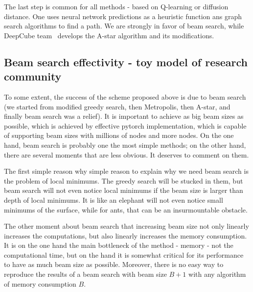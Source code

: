 \documentclass[atmp]{ipart_v1}
\numberwithin{equation}{section}
\theoremstyle{plain}%
\begin{document}
The last step is common for all methods - based on Q-learning or diffusion distance. One uses neural network predictions as a heuristic function ans graph search algorithms to find a path. We are strongly in favor of beam search, while DeepCube team~\cite{mcaleer2019solving, agostinelli2019solving, khandelwal2024towards,agostinelli2024q} develops the A-star algorithm and its modifications.

\subsection{Beam search effectivity - toy model of research community }

To some extent, the success of the scheme proposed above is due to beam search (we started from modified greedy search, then Metropolis, then A-star, and finally beam search was a relief). It is important to achieve as big beam sizes as possible, which is achieved by effective pytorch implementation, which  is capable of supporting beam sizes with millions of nodes and more nodes. On the one hand, beam search is probably one the most simple methods; on the other hand, there are several moments that are less obvious. It deserves to comment on them. 

The first simple reason why simple reason to explain why we need beam search is the problem of local minimums. The greedy search will be stucked in them, but beam search will not even notice local minimums if the beam size is larger than depth of local minimums. 
It is like an elephant will not even notice small minimums of the surface, while for ants, that can be an insurmountable obstacle. 

The other moment about beam search that increasing beam size not only linearly increases the computations, but also linearly increases the memory consumption. It is on the one hand the main bottleneck of the method - memory - not the computational time, but on the hand it is somewhat critical for its performance to have as much beam size as possible. Moreover, there is no easy way to reproduce the results of a beam search with beam size $B+1$ with any algorithm of memory consumption $B$.  
\end{document}
